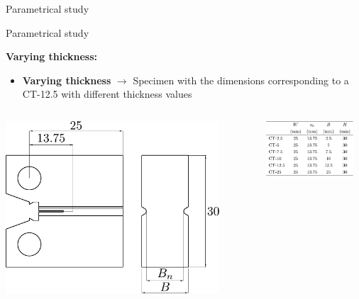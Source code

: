 \documentclass[9pt]{beamer}
\begin{document}
\begin{frame}{Parametrical study}
\end{frame}


\begin{frame}{Parametrical study}

\textcolor{MINESBlue}{\textbf{\large Varying thickness:}}
\vspace{0.3cm}
\begin{itemize}
        \item \textbf{Varying thickness} $\rightarrow$ Specimen with the dimensions corresponding to a CT-12.5 with different thickness values
    \end{itemize}

    \vspace{0.5cm}

    \begin{columns}
        \centering
        \includegraphics[width=0.87\textwidth]{Images/geo_size_effect.pdf}
        
        \centering
        \includegraphics[width=0.9\textwidth]{Images/tab_size_effect.pdf}
    \end{columns}

\end{frame}
\end{document}
